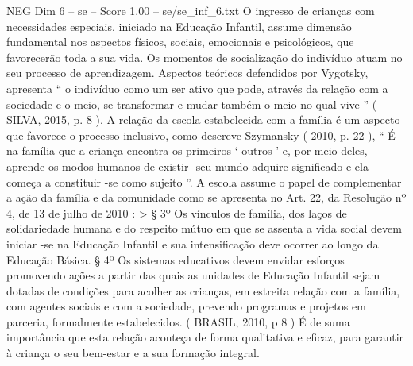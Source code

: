 \begin{textsample}{NEG Dim 6 – se – Score 1.00 – se/se\_inf\_6.txt}
O ingresso de crianças com necessidades especiais, iniciado na Educação Infantil, assume dimensão fundamental nos aspectos físicos, sociais, emocionais e psicológicos, que favorecerão toda a sua vida.
Os momentos de socialização do indivíduo atuam no seu processo de aprendizagem.
Aspectos teóricos defendidos por Vygotsky, apresenta “ o indivíduo como um ser ativo que pode, através da relação com a sociedade e o meio, se transformar e mudar também o meio no qual vive ” ( SILVA, 2015, p. 8 ).
A relação da escola estabelecida com a família é um aspecto que favorece o processo inclusivo, como descreve Szymansky ( 2010, p. 22 ), “ É na família que a criança encontra os primeiros ‘ outros ’ e, por meio deles, aprende os modos humanos de existir- seu mundo adquire significado e ela começa a constituir -se como sujeito ”.
A escola assume o papel de complementar a ação da família e da comunidade como se apresenta no Art. 22, da Resolução nº 4, de 13 de julho de 2010 : > § 3º Os vínculos de família, dos laços de solidariedade humana e do respeito mútuo em que se assenta a vida social devem iniciar -se na Educação Infantil e sua intensificação deve ocorrer ao longo da Educação Básica. § 4º Os sistemas educativos devem envidar esforços promovendo ações a partir das quais as unidades de Educação Infantil sejam dotadas de condições para acolher as crianças, em estreita relação com a família, com agentes sociais e com a sociedade, prevendo programas e projetos em parceria, formalmente estabelecidos. ( BRASIL, 2010, p 8 ) É de suma importância que esta relação aconteça de forma qualitativa e eficaz, para garantir à criança o seu bem-estar e a sua formação integral.

\end{textsample}
